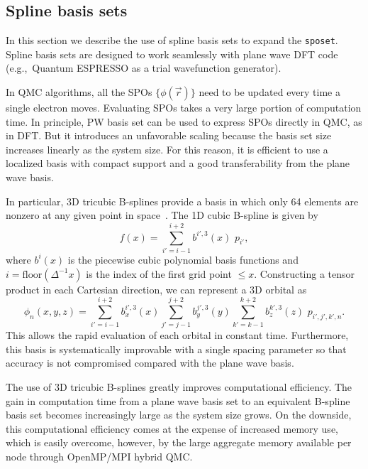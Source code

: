 \subsection{Spline basis sets}
\label{sec:spo_spline}
In this section we describe the use of spline basis sets to expand the \texttt{sposet}.
Spline basis sets are designed to work seamlessly with plane wave DFT code (e.g.,\ Quantum ESPRESSO as a trial wavefunction generator).

In QMC algorithms, all the SPOs $\{\phi(\vec{r})\}$ need to be updated every time a single electron moves.
Evaluating SPOs takes a very large portion of computation time.
In principle, PW basis set can be used to express SPOs directly in QMC, as in DFT.
But it introduces an unfavorable scaling because the basis set size increases linearly as the system size.
For this reason, it is efficient to use a localized basis with compact
support and a good transferability from the plane wave basis. 

In particular, 3D tricubic B-splines provide a basis in which only
64 elements are nonzero at any given point in space~\cite{blips4QMC}.
The 1D cubic B-spline is given by
\begin{equation}
f(x) = \sum_{i'=i-1}^{i+2} b^{i'\!,3}(x)\,\,  p_{i'},
\label{eq:SplineFunc}
\end{equation}
where $b^{i}(x)$ is the piecewise cubic polynomial basis functions
and $i = \text{floor}(\Delta^{-1} x)$ is the index of
the first grid point $\le x$.  Constructing a tensor product in each Cartesian
direction, we can represent a 3D orbital as
\begin{equation}
  \phi_n(x,y,z) = 
  \!\!\!\!\sum_{i'=i-1}^{i+2} \!\! b_x^{i'\!,3}(x) 
  \!\!\!\!\sum_{j'=j-1}^{j+2} \!\! b_y^{j'\!,3}(y) 
  \!\!\!\!\sum_{k'=k-1}^{k+2} \!\! b_z^{k'\!,3}(z) \,\, p_{i', j', k',n}.
\label{eq:TricubicValue}
\end{equation}
This allows the rapid evaluation of each orbital in constant time.
Furthermore, this basis is systematically improvable with a single spacing
parameter so that accuracy is not compromised compared with the plane wave basis.

The use of 3D tricubic B-splines greatly improves computational efficiency.
The gain in computation time from a plane wave basis set to an equivalent B-spline basis set 
becomes increasingly large as the system size grows.
On the downside, this computational efficiency comes at
the expense of increased memory use, which is easily overcome, however, by the large
aggregate memory available per node through OpenMP/MPI hybrid QMC.

